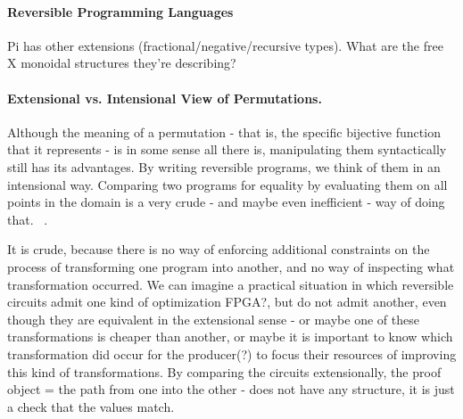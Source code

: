 








\paragraph{Reversible Programming Languages}

Pi has other extensions (fractional/negative/recursive types).
What are the free X monoidal structures they're describing?



\paragraph{Extensional vs. Intensional View of Permutations.}
Although the meaning of a permutation - that is, the specific bijective function
that it represents - is in some sense all there is, manipulating them
syntactically still has its advantages. By writing reversible programs, we think
of them in an intensional way. Comparing two programs for equality by evaluating
them on all points in the domain is a very crude - and maybe even inefficient -
way of doing that. ~\cite{Kuehlmann:2006:RBR:2298470.2300327,10.1007/978-3-540-24605-3_4,Yamashita:2010:FEQ:1835957.1835965}.

It is crude, because there is no way of enforcing additional constraints on the
process of transforming one program into another, and no way of inspecting what
transformation occurred. We can imagine a practical situation in which reversible
circuits admit one kind of optimization FPGA?, but do not admit another,
even though they are equivalent in the extensional sense - or maybe one of these
transformations is cheaper than another, or maybe it is important to know which
transformation did occur for the producer(?) to focus their resources of
improving this kind of transformations. By comparing the circuits extensionally,
the proof object = the path from one into the other - does not have any
structure,  it is just a check that the values match.

